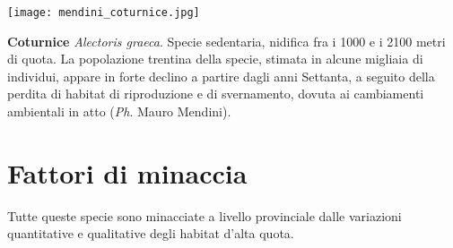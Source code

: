 \documentclass[10pt,twoside,openany,x11names,svgnames,italian,a5paper,dvipsnames,table]{memoir}
\newcommand\chapterillustration{}
\newcommand{\ph}{\emph{Ph}. }
\begin{document}
\begin{center}
\texttt{[image: mendini\_coturnice.jpg]}
\end{center}
\captionsetup{width=0.9\columnwidth}
\caption*{\textbf{Coturnice} \emph{Alectoris graeca}. Specie sedentaria, nidifica fra i 1000 e i 2100 metri di quota. La popolazione trentina della specie, stimata in alcune migliaia di individui, appare in forte declino a partire dagli anni Settanta, a seguito della perdita di habitat di riproduzione e di svernamento, dovuta ai cambiamenti ambientali in atto (\ph Mauro Mendini).}
\vspace*{\fill}

 
\chapter{Fattori di minaccia}
\renewcommand\chapterillustration{3.JPG}

Tutte queste specie sono minacciate a livello provinciale dalle variazioni quantitative e qualitative degli habitat d’alta quota.
\end{document}
